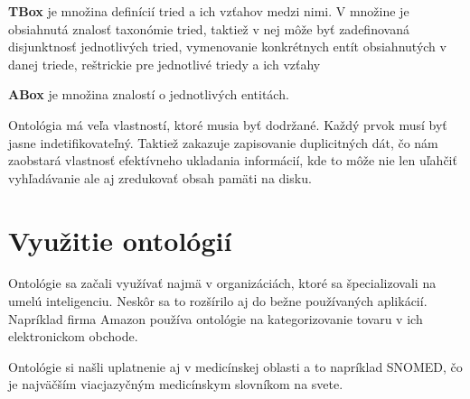 \documentclass[12pt, a4paper, oneside]{book}
\begin{document}
\textbf{TBox} je množina definícií tried a ich vzťahov medzi nimi. V množine je obsiahnutá znalosť taxonómie tried, taktiež v nej môže byť zadefinovaná disjunktnosť jednotlivých tried, vymenovanie konkrétnych entít obsiahnutých v danej triede, reštrickie pre jednotlivé triedy a ich vzťahy


\textbf{ABox} je množina znalostí o jednotlivých entitách.


Ontológia má veľa vlastností, ktoré musia byť dodržané. Každý prvok musí byť jasne indetifikovateľný. Taktiež zakazuje zapisovanie duplicitných dát, čo nám zaobstará vlastnosť efektívneho ukladania informácií, kde to môže nie len uľahčiť vyhľadávanie ale aj zredukovať obsah pamäti na disku. 


\section{Využitie ontológií}

Ontológie sa začali využívať najmä v organizáciách, ktoré sa špecializovali na umelú inteligenciu. Neskôr sa to rozšírilo aj do bežne používaných aplikácií. Napríklad firma Amazon používa ontológie na kategorizovanie tovaru v ich elektronickom obchode.



Ontológie si našli uplatnenie aj v medicínskej oblasti a to napríklad SNOMED, čo je najväčším viacjazyčným medicínskym slovníkom na svete. 
\end{document}

